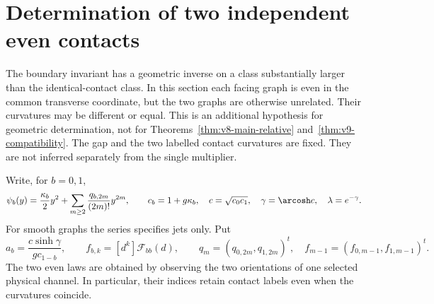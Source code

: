 \section{Determination of two independent even contacts}
\label{sec:v12-two-contact}
The boundary invariant has a geometric inverse on a class substantially
larger than the identical-contact class. In this section each facing
graph is even in the common transverse coordinate, but the two graphs
are otherwise unrelated. Their curvatures may be different or equal.
This is an additional hypothesis for geometric determination, not for
Theorems~\ref{thm:v8-main-relative} and~\ref{thm:v9-compatibility}.
The gap and the two labelled contact curvatures are fixed. They are not
inferred separately from the single multiplier.

Write, for $b=0,1$,
\begin{equation}\label{eq:v12-two-jets}
 \psi_b(y)=\frac{\kappa_b}2y^2+
       \sum_{m\ge2}\frac{q_{b,2m}}{(2m)!}y^{2m},\qquad
 c_b=1+g\kappa_b,\quad c=\sqrt{c_0c_1},\quad
 \gamma=\arcosh c,\quad \lambda=e^{-\gamma}.
\end{equation}
For smooth graphs the series specifies jets only. Put
\[
 a_b=\frac{c\sinh\gamma}{g c_{1-b}},\qquad
 f_{b,k}=[d^k]\mathcal F_{bb}(d),\qquad
 q_m=(q_{0,2m},q_{1,2m})^t,\quad
 f_{m-1}=(f_{0,m-1},f_{1,m-1})^t.
\]
The two even laws are obtained by observing the two orientations of
one selected physical channel. In particular, their indices retain
contact labels even when the curvatures coincide.

